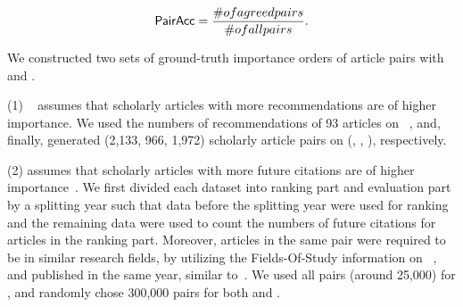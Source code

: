 \vspace{-1ex}

\begin{small}
\begin{equation}
\label{eq-metric}
\PairAcc=\frac{\#\mbox{ of agreed pairs}}{\# \mbox{ of all pairs}}.
\end{equation}
\end{small}
\vspace{-3ex}

We constructed two sets of ground-truth importance orders of article pairs with \recom and \fcita.

\noindent
(1) \recom~\cite{Liang16AAAI} assumes that scholarly articles with more recommendations are of higher importance.
We used the numbers of recommendations of 93 articles on \aan~\cite{Liang16AAAI}, %
and, finally, %
generated (2,133, 966, 1,972) scholarly article pairs on (\aan, \aminer, \magdata), respectively.


\noindent
(2) \fcita assumes that scholarly articles with more future citations are of higher importance~\cite{Wang13AAAI,Wang16TIST,Li08TSRanking}.
We first divided each dataset into ranking part and evaluation part by a splitting year such that data before the splitting year were used for ranking and the remaining data were used to count the numbers of future citations for articles in the ranking part.
%
Moreover, articles in the same pair were required to be in similar research fields, by utilizing the Fields-Of-Study information on \magdata~\cite{Sinha15:MAG}, and published in the same year, similar to~\cite{Wang16TIST}.
We used all pairs (around 25,000) for \aan, and randomly chose 300,000 pairs for both \aminer and \magdata.


